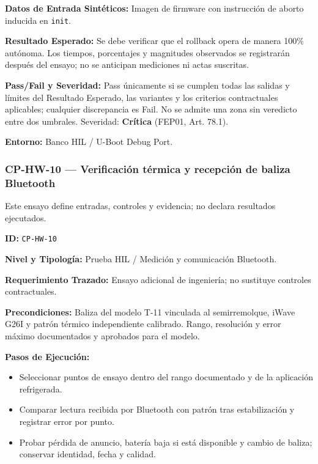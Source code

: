\par\noindent \textbf{Datos de Entrada Sintéticos:} Imagen de firmware con instrucción de aborto inducida en \texttt{init}.\par
\par\noindent \textbf{Resultado Esperado:} Se debe verificar que el rollback opera de manera 100\% autónoma. Los tiempos, porcentajes y magnitudes observados se registrarán después del ensayo; no se anticipan mediciones ni actas suscritas.\par
\par\noindent \textbf{Pass/Fail y Severidad:} Pass únicamente si se cumplen todas las salidas y límites del Resultado Esperado, las variantes y los criterios contractuales aplicables; cualquier discrepancia es Fail. No se admite una zona sin veredicto entre dos umbrales. Severidad: \textbf{Crítica} (FEP01, Art. 78.1).\par
\par\noindent \textbf{Entorno:} Banco HIL / U-Boot Debug Port.\par


\subsubsection*{CP-HW-10 — Verificación térmica y recepción de baliza Bluetooth}\label{sec:9-cp-hw-10}

Este ensayo define entradas, controles y evidencia; no declara resultados ejecutados.

\par\noindent\textbf{ID:} \texttt{CP-\allowbreak{}HW-\allowbreak{}10}\par
\par\noindent\textbf{Nivel y Tipología:} Prueba HIL / Medición y comunicación Bluetooth.\par
\par\noindent\textbf{Requerimiento Trazado:} Ensayo adicional de ingeniería; no sustituye controles contractuales.\par
\par\noindent\textbf{Precondiciones:} Baliza del modelo T-11 vinculada al semirremolque, iWave G26I y patrón térmico independiente calibrado. Rango, resolución y error máximo documentados y aprobados para el modelo.\par
\par\noindent\textbf{Pasos de Ejecución:}\par
\begin{itemize}
\item Seleccionar puntos de ensayo dentro del rango documentado y de la aplicación refrigerada.
\item Comparar lectura recibida por Bluetooth con patrón tras estabilización y registrar error por punto.
\item Probar pérdida de anuncio, batería baja si está disponible y cambio de baliza; conservar identidad, fecha y calidad.
\end{itemize}

